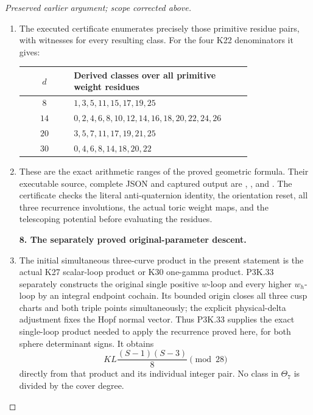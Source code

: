 \begin{proof}[Preserved earlier argument; scope corrected above]
\begin{enumerate}[label=\arabic*.]
\item The executed certificate enumerates precisely those
primitive residue pairs, with witnesses for every
resulting class. For the four K22 denominators it gives:

\begin{center}\begin{tabular}{c p{0.78\linewidth}}\toprule
\(d\) & Derived classes over all primitive weight residues\\
\midrule
\(8\) & \(1,3,5,11,15,17,19,25\)\\
\(14\) & \(0,2,4,6,8,10,12,14,16,18,20,22,24,26\)\\
\(20\) & \(3,5,7,11,17,19,21,25\)\\
\(30\) & \(0,4,6,8,14,18,20,22\)\\
\bottomrule\end{tabular}\end{center}

\item These are the exact arithmetic ranges of the proved
geometric formula. Their executable
source, complete JSON and captured output are
,
,
and .
The certificate checks the literal anti-quaternion
identity, the orientation reset, all three recurrence
involutions, the actual toric weight maps, and the
telescoping potential before evaluating the residues.

\par\medskip\noindent\textbf{8. The separately proved original-parameter descent.}\enspace

\item The initial simultaneous three-curve product in the present
statement is the actual K27 scalar-loop product or K30
one-gamma product. P3K.33 separately constructs the original
single positive \(w\)-loop and every higher \(w_h\)-loop
by an integral endpoint cochain. Its bounded origin closes
all three cusp charts and both triple points simultaneously;
the explicit physical-delta adjustment fixes the Hopf normal
vector. Thus P3K.33 supplies the exact single-loop product
needed to apply the recurrence proved here, for both sphere
determinant signs. It obtains
\[
             KL\frac{(S-1)(S-3)}8\pmod{28}
\]
directly from that product and its individual integer pair.
No class in \(\Theta_7\) is divided by the cover degree.

\end{enumerate}
\end{proof}